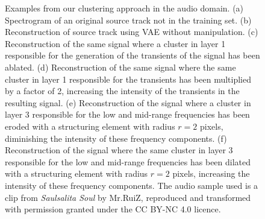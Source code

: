 \begin{figure}[tp!]
   \hfill
    \hfill
   \caption[A comparison of different transforms being applied to different clusters in various layers of the SpectrogramVAE]{Examples from our clustering approach in the audio domain. (a) Spectrogram of an original source track not in the training set. (b) Reconstruction of source track using VAE without manipulation. (c) Reconstruction of the same signal where a cluster in layer 1 responsible for the generation of the transients of the signal has been ablated. (d) Reconstruction of the same signal where the same cluster in layer 1 responsible for the transients has been multiplied by a factor of 2, increasing the intensity of the transients in the resulting signal. (e) Reconstruction of the signal where a cluster in layer 3 responsible for the low and mid-range frequencies has been eroded with a structuring element with radius $r=2$ pixels, diminishing the intensity of these frequency components. (f) Reconstruction of the signal where the same cluster in layer 3 responsible for the low and mid-range frequencies has been dilated with a structuring element with radius $r=2$ pixels, increasing the intensity of these frequency components. The audio sample used is a clip from \textit{Saulsalita Soul} by Mr.RuiZ, reproduced and transformed with permission granted under the CC BY-NC 4.0 licence.}
   \label{fig:c5:cluster_audio_comp}
\end{figure}

